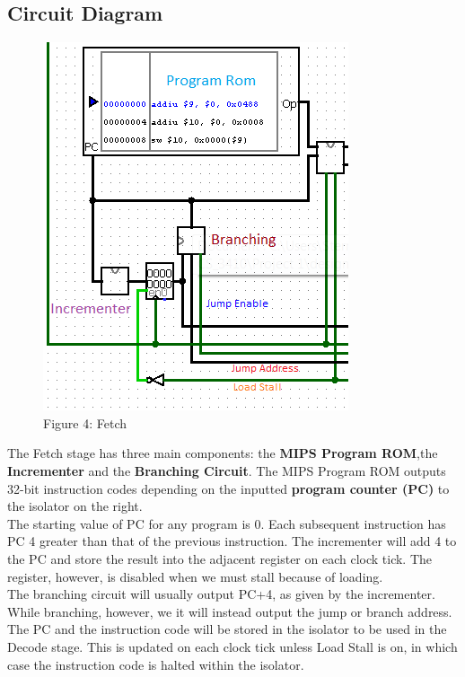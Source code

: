 \documentclass{article}
\begin{document}
\subsection{Circuit Diagram}
\begin{figure}
\vspace{-1.7cm}
\begin{center}
\includegraphics[scale=0.8]{Fetch.png} \\
Figure 4: Fetch
\end{center}
\vspace{-1.2cm}
\end{figure}
The Fetch stage has three main components: the \textbf{MIPS Program ROM},the \textbf{Incrementer} and the \textbf{Branching Circuit}. The MIPS Program ROM outputs 32-bit instruction codes depending on the inputted \textbf{program counter (PC)} to the isolator on the right. \\
The starting value of PC for any program is 0. Each subsequent instruction has PC 4 greater than that of the previous instruction. The incrementer will add 4 to the PC and store the result into the adjacent register on each clock tick. The register, however, is disabled when we must stall because of loading. \\
The branching circuit will usually output PC+4, as given by the incrementer. While branching, however, we it will instead output the jump or branch address. \\
The PC and the instruction code will be stored in the isolator to be used in the Decode stage. This is updated on each clock tick unless Load Stall is on, in which case the instruction code is halted within the isolator. 
\end{document}
